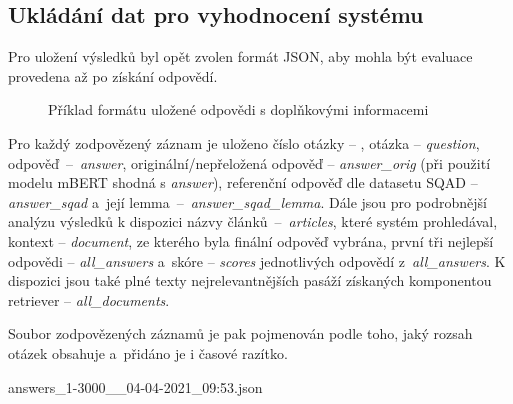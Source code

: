 \subsection{Ukládání dat pro vyhodnocení systému}
Pro uložení výsledků byl opět zvolen formát JSON, aby mohla být evaluace provedena až po získání odpovědí.\par
\begin{figure}[H]
	\centering
	\caption{Příklad formátu uložené odpovědi s doplňkovými informacemi}
	\label{fig:saved_answer}
\end{figure}
Pro každý zodpovězený záznam je uloženo číslo otázky -- , otázka -- \emph{question}, odpověď~--~\emph{answer}, originální/nepřeložená odpověď -- \emph{answer\_orig} (při použití modelu mBERT shodná s \emph{answer}), referenční odpověď dle datasetu SQAD -- \emph{answer\_sqad} a~její lemma~--~\mbox{\emph{answer\_sqad\_lemma}}. Dále jsou pro podrobnější analýzu výsledků k dispozici názvy člán\-ků~--~\emph{articles}, které systém prohledával, kontext -- \emph{document}, ze kterého byla finální odpověď vybrána, první tři nejlepší odpovědi -- \emph{all\_answers} a~skóre -- \emph{scores} jednotlivých odpovědí z~\emph{all\_answers}. K dispozici jsou také plné texty nejrelevantnějších pasáží získaných komponentou retriever -- \emph{all\_documents}.\par
Soubor zodpovězených záznamů je pak pojmenován podle toho, jaký rozsah otázek obsahuje a~přidáno je i časové razítko.
\begin{center}
    answers\_1-3000\_\_04-04-2021\_09:53.json
\end{center}

